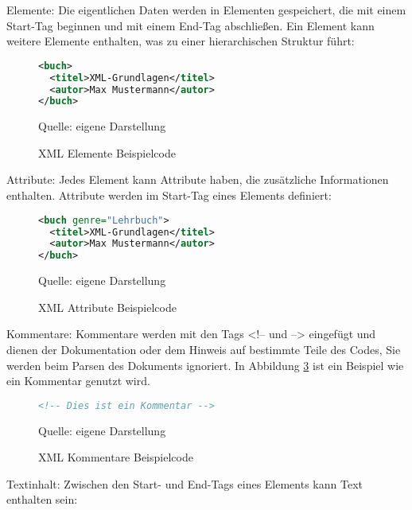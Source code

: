 Elemente: Die eigentlichen Daten werden in Elementen gespeichert, die mit einem Start-Tag beginnen und mit einem End-Tag abschließen.
Ein Element kann weitere Elemente enthalten, was zu einer hierarchischen Struktur führt:

\begin{figure}[H]
\centering
\begin{minipage}{0.95\textwidth}
\begin{lstlisting}[language=XML]
<buch>
  <titel>XML-Grundlagen</titel>
  <autor>Max Mustermann</autor>
</buch>
\end{lstlisting}
\end{minipage}
\caption{XML Elemente Beispielcode}
\label{fig:XML Elemente Beispielcode}
    {Quelle: eigene Darstellung}
\end{figure}

Attribute: Jedes Element kann Attribute haben, die zusätzliche Informationen enthalten.
Attribute werden im Start-Tag eines Elements definiert:

\begin{figure}[H]
\centering
\begin{minipage}{0.95\textwidth}
\begin{lstlisting}[language=XML]
<buch genre="Lehrbuch">
  <titel>XML-Grundlagen</titel>
  <autor>Max Mustermann</autor>
</buch>
\end{lstlisting}
\end{minipage}
\caption{XML Attribute Beispielcode}
\label{fig:XML Attribute Beispielcode}
    {Quelle: eigene Darstellung}
\end{figure}

Kommentare: Kommentare werden mit den Tags <!-- und --> eingefügt und dienen der Dokumentation oder dem Hinweis auf bestimmte Teile des Codes,
Sie werden beim Parsen des Dokuments ignoriert.
In Abbildung \ref{fig:XML Kommentare Beispielcode} ist ein Beispiel wie
ein Kommentar genutzt wird.

\begin{figure}[H]
\centering
\begin{minipage}{0.95\textwidth}
\begin{lstlisting}[language=XML]
<!-- Dies ist ein Kommentar -->
\end{lstlisting}
\end{minipage}
\caption{XML Kommentare Beispielcode}
\label{fig:XML Kommentare Beispielcode}
    {Quelle: eigene Darstellung}
\end{figure}

Textinhalt: Zwischen den Start- und End-Tags eines Elements kann Text enthalten sein:

